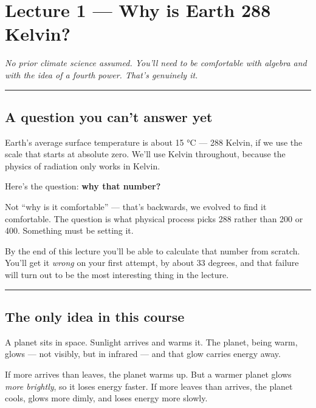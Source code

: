\section{Lecture 1 --- Why is Earth 288
Kelvin?}\label{lecture-1-why-is-earth-288-kelvin}

\emph{No prior climate science assumed. You'll need to be comfortable
with algebra and with the idea of a fourth power. That's genuinely it.}

\begin{center}\rule{0.5\linewidth}{0.5pt}\end{center}

\subsection{A question you can't answer
yet}\label{a-question-you-cant-answer-yet}

Earth's average surface temperature is about 15 °C --- 288 Kelvin, if we
use the scale that starts at absolute zero. We'll use Kelvin throughout,
because the physics of radiation only works in Kelvin.

Here's the question: \textbf{why that number?}

Not ``why is it comfortable'' --- that's backwards, we evolved to find
it comfortable. The question is what physical process picks 288 rather
than 200 or 400. Something must be setting it.

By the end of this lecture you'll be able to calculate that number from
scratch. You'll get it \emph{wrong} on your first attempt, by about 33
degrees, and that failure will turn out to be the most interesting thing
in the lecture.

\begin{center}\rule{0.5\linewidth}{0.5pt}\end{center}

\subsection{The only idea in this
course}\label{the-only-idea-in-this-course}

A planet sits in space. Sunlight arrives and warms it. The planet, being
warm, glows --- not visibly, but in infrared --- and that glow carries
energy away.

If more arrives than leaves, the planet warms up. But a warmer planet
glows \emph{more brightly}, so it loses energy faster. If more leaves
than arrives, the planet cools, glows more dimly, and loses energy more
slowly.


